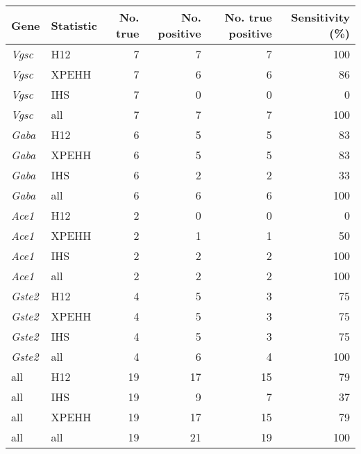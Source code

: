\begin{tabular}{llrrrr}
\toprule
           Gene & Statistic & No. true & No. positive & No. true positive & Sensitivity (\%) \\
\midrule
  \textit{Vgsc} &       H12 &        7 &            7 &                 7 &              100 \\
  \textit{Vgsc} &     XPEHH &        7 &            6 &                 6 &               86 \\
  \textit{Vgsc} &       IHS &        7 &            0 &                 0 &                0 \\
  \textit{Vgsc} &       all &        7 &            7 &                 7 &              100 \\
  \textit{Gaba} &       H12 &        6 &            5 &                 5 &               83 \\
  \textit{Gaba} &     XPEHH &        6 &            5 &                 5 &               83 \\
  \textit{Gaba} &       IHS &        6 &            2 &                 2 &               33 \\
  \textit{Gaba} &       all &        6 &            6 &                 6 &              100 \\
  \textit{Ace1} &       H12 &        2 &            0 &                 0 &                0 \\
  \textit{Ace1} &     XPEHH &        2 &            1 &                 1 &               50 \\
  \textit{Ace1} &       IHS &        2 &            2 &                 2 &              100 \\
  \textit{Ace1} &       all &        2 &            2 &                 2 &              100 \\
 \textit{Gste2} &       H12 &        4 &            5 &                 3 &               75 \\
 \textit{Gste2} &     XPEHH &        4 &            5 &                 3 &               75 \\
 \textit{Gste2} &       IHS &        4 &            5 &                 3 &               75 \\
 \textit{Gste2} &       all &        4 &            6 &                 4 &              100 \\
            all &       H12 &       19 &           17 &                15 &               79 \\
            all &       IHS &       19 &            9 &                 7 &               37 \\
            all &     XPEHH &       19 &           17 &                15 &               79 \\
            all &       all &       19 &           21 &                19 &              100 \\
\bottomrule
\end{tabular}
